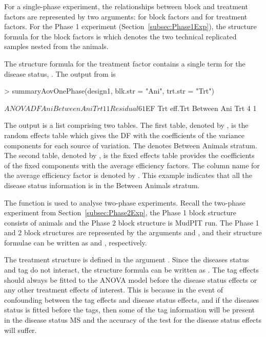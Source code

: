 \documentclass[article]{jss}
\begin{document}
For a single-phase experiment, the relationships between block and treatment factors are represented by two arguments:  for block factors and  for treatment factors. For the Phase 1 experiment (Section~\ref{subsec:Phase1Exp}), the structure formula for the block factors is  which denotes the two technical replicated samples nested from the animals. 

The structure formula for the treatment factor contains a single term for the disease status, . The output from  is 
\begin{CodeChunk}
\begin{CodeInput}
> summaryAovOnePhase(design1, blk.str = "Ani", trt.str = "Trt") 
\end{CodeInput}
\begin{CodeOutput}
$ANOVA
            DF Ani
Between Ani       
   Trt      1  1  
   Residual 6  1  

$EF
            Trt eff.Trt
Between Ani            
   Trt      4   1      
\end{CodeOutput}
\end{CodeChunk}
The output is a list comprising two tables. The first table, denoted by , is the random effects table which gives the DF with the coefficients of the variance components for each source of variation. The  denotes Between Animals stratum. The second table, denoted by , is the fixed effects table provides the coefficients of the fixed components with the average efficiency factors. The column name for the average efficiency factor is denoted by . This example indicates that all the disease status information is in the Between Animals stratum.

The function  is used to analyse two-phase experiments. Recall the two-phase experiment from Section~\ref{subsec:Phase2Exp}, the Phase 1 block structure consists of animals and the Phase 2 block structure is MudPIT run. The Phase 1 and 2 block structures are represented by the arguments  and , and their structure formulae can be written as  and , respectively.

The treatment structure is defined in the argument . Since the diseases status and tag do not interact, the structure formula can be written as . The tag effects should always be fitted to the ANOVA model before the disease status effects or any other treatment effects of interest. This is because in the event of confounding between the tag effects and disease status effects, and if the diseases status is fitted before the tags, then some of the tag information will be present in the disease status MS and the accuracy of the test for the disease status effects will suffer. 
\end{document}
